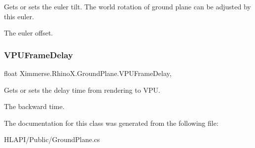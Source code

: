 Gets or sets the euler tilt. The world rotation of ground plane can be adjusted by this euler. 

The euler offset.\mbox{\label{class_ximmerse_1_1_rhino_x_1_1_ground_plane_ad865efbe2157148db7f6ee7513b461b8}} 
\subsubsection{\texorpdfstring{V\+P\+U\+Frame\+Delay}{VPUFrameDelay}}
{\footnotesize\ttfamily float Ximmerse.\+Rhino\+X.\+Ground\+Plane.\+V\+P\+U\+Frame\+Delay\hspace{0.3cm}{\ttfamily [get]}, {\ttfamily [set]}}



Gets or sets the delay time from rendering to V\+PU. 

The backward time.

The documentation for this class was generated from the following file\+:\begin{DoxyCompactItemize}
\item 
H\+L\+A\+P\+I/\+Public/Ground\+Plane.\+cs\end{DoxyCompactItemize}
